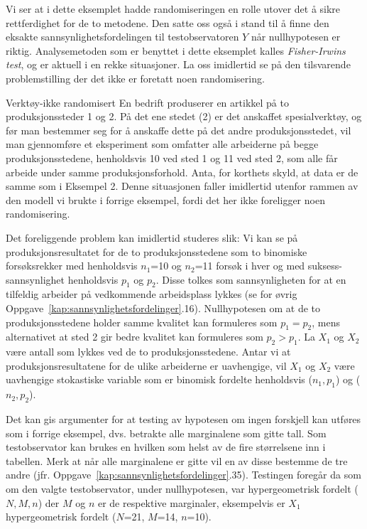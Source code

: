 Vi ser at i dette eksemplet hadde randomiseringen en rolle utover
det å sikre rettferdighet for de to metodene.  Den satte oss også
i stand til å finne den eksakte sannsynlighetsfordelingen til 
testobservatoren $Y$ når nullhypotesen er riktig. 
Analysemetoden som er benyttet i dette eksemplet kalles
{\em Fisher-Irwins test}, og er aktuell i en rekke situasjoner.  La oss
imid\-ler\-tid se på den tilsvarende problemstilling der det ikke er
foretatt noen randomisering.\\

\begin{eksempel}{Verktøy-ikke randomisert}
En bedrift produserer en artikkel på to produksjonssteder 1 og 2.
På det ene stedet (2) er det anskaffet spesialverktøy, og før
man bestemmer seg for å anskaffe dette på det andre 
produksjonsstedet, vil man gjennomføre et eksperiment som omfatter
alle arbeiderne på begge produksjonsstedene, henholdsvis 10 ved
sted 1 og 11 ved sted 2, som alle får arbeide under samme
produksjonsforhold.  Anta, for korthets skyld, at data er de samme som
i Eksempel 2.  Denne situasjonen faller imidlertid utenfor rammen av den 
modell vi brukte i forrige eksempel, fordi det her ikke foreligger
noen randomisering. 

 Det foreliggende problem kan imidlertid studeres
slik:  Vi kan se på produksjonsresultatet for de to 
produksjonsstedene som to binomiske forsøks\-rekker med henholdsvis
$n_1$=10 og $n_2$=11 forsøk i hver og med suksess-sannsynlighet
henholdsvis $p_1$ og $p_2$.  Disse tolkes som sannsynligheten for at
en tilfeldig arbeider på vedkommende arbeidsplass lykkes (se
for øvrig Oppgave~\ref*{kap:sannsynlighetsfordelinger}.16).  Nullhypotesen om at de to produksjonsstedene
holder samme kvalitet kan formuleres som $p_1 = p_2$, mens alternativet
at sted 2 gir bedre kvalitet kan formuleres som $p_2>p_1$.  La $X_1$
og $X_2$ være antall som lykkes ved de to produksjonsstedene.
Antar vi at produksjonsresultatene for de ulike arbeiderne er uavhengige,
vil $X_1$ og $X_2$ være uavhengige stokastiske variable som er
binomisk fordelte henholdsvis ($n_1,p_1$) og ($n_2,p_2$).  

Det kan gis argumenter for at testing av hypotesen om ingen forskjell
kan utføres som i forrige eksempel, dvs. betrakte alle marginalene
som gitte tall.  Som testobservator kan brukes en hvilken som helst av
de fire størrelsene inn i tabellen. Merk at når alle 
marginalene er gitte vil en av disse bestemme de tre andre 
(jfr. Oppgave~\ref*{kap:sannsynlighetsfordelinger}.35).  Testingen foregår da som om den valgte 
testobservator, under nullhypotesen, var hypergeometrisk fordelt 
($N,M,n$) der $M$ og $n$ er de respektive marginaler, eksempelvis er
$X_1$ hypergeometrisk fordelt ($N$=21, $M$=14, $n$=10).
\end{eksempel}


